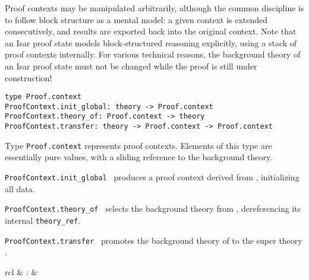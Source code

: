 \begin{isabellebody}
\begin{isamarkuptext}
  Proof contexts may be manipulated arbitrarily, although the common
  discipline is to follow block structure as a mental model: a given
  context is extended consecutively, and results are exported back
  into the original context.  Note that an Isar proof state models
  block-structured reasoning explicitly, using a stack of proof
  contexts internally.  For various technical reasons, the background
  theory of an Isar proof state must not be changed while the proof is
  still under construction!%
\end{isamarkuptext}%
\isamarkuptrue%
%
\isadelimmlref
%
\endisadelimmlref
%
\isatagmlref
%
\begin{isamarkuptext}%
\begin{mldecls}
  \verb|type Proof.context| \\
  \verb|ProofContext.init_global: theory -> Proof.context| \\
  \verb|ProofContext.theory_of: Proof.context -> theory| \\
  \verb|ProofContext.transfer: theory -> Proof.context -> Proof.context| \\
  \end{mldecls}

  \begin{description}

  \item Type \verb|Proof.context| represents proof contexts.
  Elements of this type are essentially pure values, with a sliding
  reference to the background theory.

  \item \verb|ProofContext.init_global|~ produces a proof context
  derived from , initializing all data.

  \item \verb|ProofContext.theory_of|~ selects the
  background theory from , dereferencing its internal
  \verb|theory_ref|.

  \item \verb|ProofContext.transfer|~ promotes the
  background theory of  to the super theory .

  \end{description}%
\end{isamarkuptext}%
\isamarkuptrue%
%
\endisatagmlref
{\isafoldmlref}%
%
\isadelimmlref
%
\endisadelimmlref
%
\isadelimmlantiq
%
\endisadelimmlantiq
%
\isatagmlantiq
%
\begin{isamarkuptext}%
\begin{matharray}{rcl}
  \hypertarget{ML antiquotation.context}{\hyperlink{ML antiquotation.context}{\mbox{}}} & : &  \\
  \end{matharray}


\end{isamarkuptext}
\end{isabellebody}
